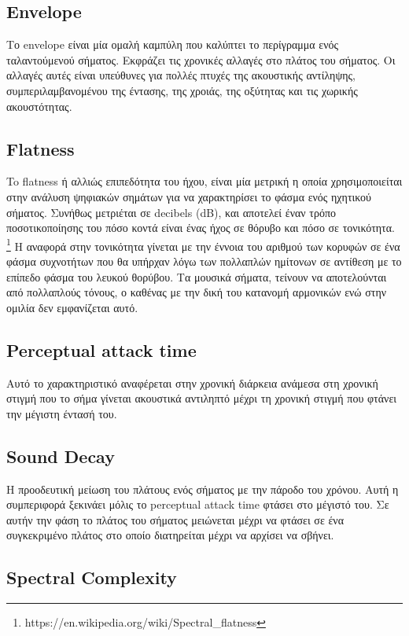  \subsection{Envelope}

Το envelope είναι μία ομαλή καμπύλη που καλύπτει το περίγραμμα ενός ταλαντούμενού σήματος. Εκφράζει τις χρονικές αλλαγές στο πλάτος του σήματος. Οι αλλαγές αυτές είναι υπεύθυνες για πολλές πτυχές της ακουστικής αντίληψης, συμπεριλαμβανομένου της έντασης, της χροιάς, της οξύτητας και τις χωρικής ακουστότητας.

\subsection{Flatness}

To flatness ή αλλιώς επιπεδότητα του ήχου, είναι μία μετρική η οποία χρησιμοποιείται στην ανάλυση ψηφιακών σημάτων για να χαρακτηρίσει το φάσμα ενός ηχητικού σήματος. Συνήθως μετριέται σε decibels (dB), και αποτελεί έναν τρόπο ποσοτικοποίησης του πόσο κοντά είναι ένας ήχος σε θόρυβο και πόσο σε τονικότητα.  \footnote{https://en.wikipedia.org/wiki/Spectral\_flatness} Η αναφορά στην τονικότητα γίνεται με την έννοια του αριθμού των κορυφών σε ένα φάσμα συχνοτήτων που θα υπήρχαν λόγω των πολλαπλών ημίτονων σε αντίθεση με το επίπεδο φάσμα του λευκού θορύβου. Τα μουσικά σήματα, τείνουν να αποτελούνται από πολλαπλούς τόνους, ο καθένας με την δική του κατανομή αρμονικών ενώ στην ομιλία δεν εμφανίζεται αυτό.

\subsection{Perceptual attack time}

Αυτό το χαρακτηριστικό αναφέρεται στην χρονική διάρκεια ανάμεσα στη χρονική στιγμή που το σήμα γίνεται ακουστικά αντιληπτό μέχρι τη χρονική στιγμή που φτάνει την μέγιστη έντασή του.

\subsection{Sound Decay}

Η προοδευτική μείωση του πλάτους ενός σήματος με την πάροδο του χρόνου. Αυτή η συμπεριφορά ξεκινάει μόλις το perceptual attack time φτάσει στο μέγιστό του. Σε αυτήν την φάση το πλάτος του σήματος μειώνεται μέχρι να φτάσει σε ένα συγκεκριμένο πλάτος στο οποίο διατηρείται μέχρι να αρχίσει να σβήνει.

\subsection{Spectral Complexity}

